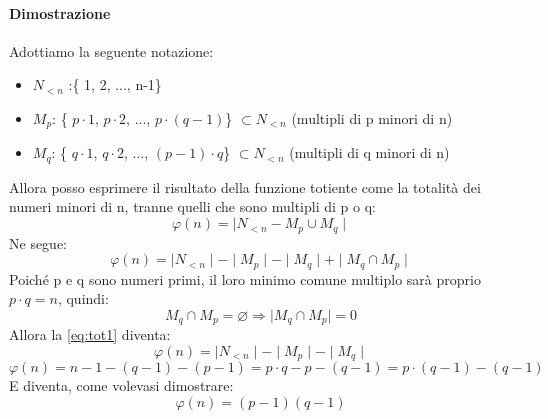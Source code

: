 \paragraph{Dimostrazione} Adottiamo la seguente notazione:
\begin{itemize}
\item $N_{<n}$ :\{ 1, 2, ..., n-1\}
\item $M_p$: \{ $p \cdot 1$, $p \cdot 2$, ..., $p \cdot (q-1)$\} $\subset N_{<n}$ (multipli di p minori di n)
\item $M_q$: \{ $q \cdot 1$, $q \cdot 2$, ..., $(p-1) \cdot q$\} $\subset N_{<n}$ (multipli di q minori di n)
\end{itemize}
Allora posso esprimere il risultato della funzione totiente come la totalità dei numeri minori di n, tranne quelli che sono multipli di p o q:
\begin{equation}
\varphi (n) = \mid N_{<n} - M_p \cup M_q \mid
\end{equation}
Ne segue:
\begin{equation} \label{eq:tot1}
\varphi (n) = \mid N_{<n} \mid - \mid M_p \mid - \mid M_q \mid + \mid M_q \cap M_p \mid
\end{equation}
Poiché p e q sono numeri primi, il loro minimo comune multiplo sarà proprio $p \cdot q = n$, quindi:
\begin{equation}
M_q \cap M_p = \varnothing \Rightarrow \mid M_q \cap M_p \mid = 0
\end{equation}
Allora la \ref{eq:tot1} diventa:
\begin{equation}
\varphi (n) = \mid N_{<n} \mid - \mid M_p \mid - \mid M_q \mid 
\end{equation}
\begin{equation}
\varphi (n) = n-1 - (q -1) - (p - 1) =  p \cdot q - p - (q - 1) =  p \cdot (q - 1) - (q - 1)
\end{equation}
E diventa, come volevasi dimostrare:
\begin{equation}
\varphi (n) = (p - 1)(q - 1)
\end{equation}

